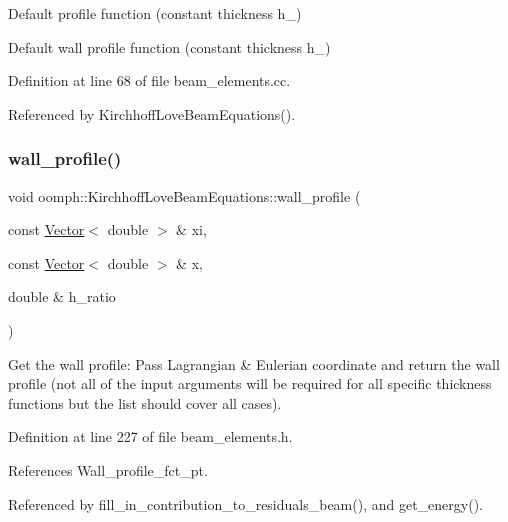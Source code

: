 Default profile function (constant thickness \textquotesingle{}h\+\_\textquotesingle{}) 

Default wall profile function (constant thickness h\+\_) 

Definition at line 68 of file beam\+\_\+elements.\+cc.



Referenced by Kirchhoff\+Love\+Beam\+Equations().

\mbox{\label{classoomph_1_1KirchhoffLoveBeamEquations_a967cb9c4cf03007464eed6edcb7bccf6}} 
\subsubsection{\texorpdfstring{wall\+\_\+profile()}{wall\_profile()}}
{\footnotesize\ttfamily void oomph\+::\+Kirchhoff\+Love\+Beam\+Equations\+::wall\+\_\+profile (\begin{DoxyParamCaption}\item[{const \hyperlink{classoomph_1_1Vector}{Vector}$<$ double $>$ \&}]{xi,  }\item[{const \hyperlink{classoomph_1_1Vector}{Vector}$<$ double $>$ \&}]{x,  }\item[{double \&}]{h\+\_\+ratio }\end{DoxyParamCaption})\hspace{0.3cm}{\ttfamily [inline]}}



Get the wall profile\+: Pass Lagrangian \& Eulerian coordinate and return the wall profile (not all of the input arguments will be required for all specific thickness functions but the list should cover all cases). 



Definition at line 227 of file beam\+\_\+elements.\+h.



References Wall\+\_\+profile\+\_\+fct\+\_\+pt.



Referenced by fill\+\_\+in\+\_\+contribution\+\_\+to\+\_\+residuals\+\_\+beam(), and get\+\_\+energy().

\mbox{\label{classoomph_1_1KirchhoffLoveBeamEquations_a283a6440586152fe987189d1fcef5a62}} 
